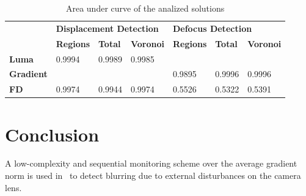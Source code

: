 \documentclass{llncs}
\begin{document}
\begin{table}[tbh]
\centering
\begin{tabular}{l|l|l|l|l|l|l|}
\cline{2-7}
& \multicolumn{3}{l|}{\cellcolor[HTML]{C0C0C0}\textbf{Displacement Detection}}  & \multicolumn{3}{l|}{\cellcolor[HTML]{C0C0C0}\textbf{Defocus Detection}} \\ \cline{2-7} 
& \cellcolor[HTML]{EFEFEF}\textbf{Regions} & \cellcolor[HTML]{EFEFEF}\textbf{Total} & \cellcolor[HTML]{EFEFEF}\textbf{Voronoi} & \cellcolor[HTML]{EFEFEF}\textbf{Regions} & \cellcolor[HTML]{EFEFEF}\textbf{Total} & \cellcolor[HTML]{EFEFEF}\textbf{Voronoi} \\ \hline
\multicolumn{1}{|l|}{\cellcolor[HTML]{EFEFEF}\textbf{Luma}}     & 0.9994 & 0.9989 & 0.9985  &            &            &             \\ \hline
\multicolumn{1}{|l|}{\cellcolor[HTML]{EFEFEF}\textbf{Gradient}} &  		 &  		  &             & 0.9895 & 0.9996 & 0.9996  \\ \hline
\multicolumn{1}{|l|}{\cellcolor[HTML]{EFEFEF}\textbf{FD}}         & 0.9974 & 0.9944 & 0.9974  & 0.5526 & 0.5322 & 0.5391  \\ \hline
\end{tabular}
\caption{Area under curve of the analized solutions}
\label{tab:AUC}
\end{table}




\section{Conclusion}\label{sec:Conclusion}
A low-complexity and sequential monitoring scheme over the average gradient norm is used in~\cite{alippi2010detecting} to detect blurring due to external disturbances on the camera lens.
\end{document}
